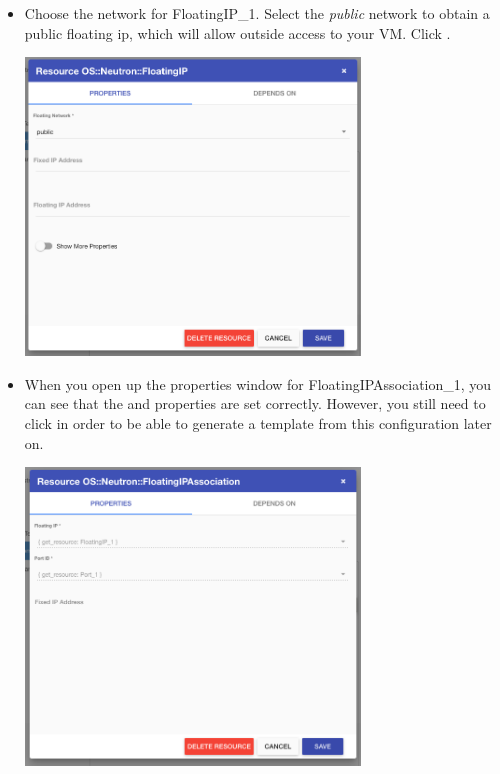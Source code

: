 \begin{enumerate}
\begin{itemize}
\begin{center}
    \end{center}
  \item Choose the network for FloatingIP\_1.  Select the \emph{public}
    network to obtain a public floating ip, which will allow outside
    access to your VM.  Click .
    \begin{center}
      \includegraphics[width=0.7\textwidth]{img/floatingip_properties}
    \end{center}
  \item When you open up the properties window for
    FloatingIPAssociation\_1, you can see that the  and  properties are set correctly.  However,
    you still need to click  in order to be able
    to generate a template from this configuration later on.
    \begin{center}
      \includegraphics[width=0.7\textwidth]{img/floatingipassociation_properties}
    \end{center}

\end{itemize}
\end{enumerate}
